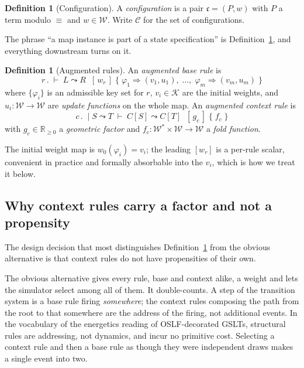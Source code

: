 \documentclass[11pt,a4paper]{article}
\theoremstyle{plain}
\theoremstyle{definition}
\newtheorem{definition}[theorem]{Definition}
\theoremstyle{remark}
\newcommand{\Rnn}{\mathbb{R}_{\geq 0}}
\newcommand{\Cfg}{\mathcal{C}}
\newcommand{\Wt}{\mathcal{W}}
\newcommand{\wmap}{w}
\newcommand{\gfac}{g}
\begin{document}
\begin{definition}[Configuration]
\label{def:config}
A \emph{configuration} is a pair $\mathfrak{c} = (P, \wmap)$ with $P$ a term modulo $\equiv$ and
$\wmap \in \Wt$. Write $\Cfg$ for the set of configurations.
\end{definition}

The phrase ``a map instance is part of a state specification'' is Definition~\ref{def:config}, and
everything downstream turns on it.

\begin{definition}[Augmented rules]
\label{def:augmented}
An \emph{augmented base rule} is
\[
r \,.\; \vdash\; L \leadsto R \;\; [\,\wmap_r\,]
\;\{\; \varphi_1 \Rightarrow (v_1, u_1), \;\ldots,\; \varphi_m \Rightarrow (v_m, u_m) \;\}
\]
where $\{\varphi_i\}$ is an admissible key set for $r$, $v_i \in \mathcal{K}$ are the initial
weights, and $u_i : \Wt \to \Wt$ are \emph{update functions} on the whole map. An \emph{augmented
context rule} is
\[
c \,.\; \mid S \leadsto T \;\vdash\; C[S] \leadsto C[T] \;\; [\,\gfac_c\,] \;\{\; f_c \;\}
\]
with $\gfac_c \in \Rnn$ a \emph{geometric factor} and $f_c : \Wt^* \times \Wt \to \Wt$ a
\emph{fold function}.
\end{definition}

The initial weight map is $\wmap_0(\varphi_i) = v_i$; the leading $[\wmap_r]$ is a per-rule scalar,
convenient in practice and formally absorbable into the $v_i$, which is how we treat it below.

\subsection{Why context rules carry a factor and not a propensity}
\label{sec:geometric}

The design decision that most distinguishes Definition~\ref{def:augmented} from the obvious
alternative is that context rules do not have propensities of their own.

The obvious alternative gives every rule, base and context alike, a weight and lets the simulator
select among all of them. It double-counts. A step of the transition system is a base rule firing
\emph{somewhere}; the context rules composing the path from the root to that somewhere are the
address of the firing, not additional events. In the vocabulary of the energetics reading of
OSLF-decorated GSLTs, structural rules are addressing, not dynamics, and incur no primitive cost.
Selecting a context rule and then a base rule as though they were independent draws makes a single
event into two.
\end{document}
